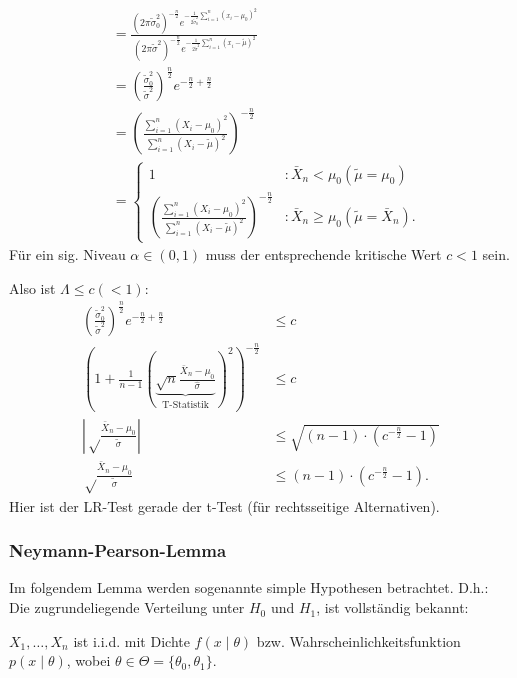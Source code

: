 \documentclass[10pt]{article}
\newcommand{\FZV}{X_1, \ldots, X_n} %
\newcommand{\sni}{\sum_{i=1}^{n}} %
\newenvironment{BSP}[1][]
{\begin{Beispiel}[frametitle=#1]}{\end{Beispiel}}
\begin{document}
\begin{BSP}[Beispiel 2.1.4 (t-Test mit einseitiger Alternative)]
\begin{equation*}
\begin{split}
			&= \frac{(2 \pi \tilde{\sigma}^2_0)^{-\frac{n}{2}} e^{-\frac{1}{2 \tilde{\sigma}^2_0} \sni (x_i - \mu_0)^2}}{(2 \pi \tilde{\sigma}^2)^{-\frac{n}{2}} e^{-\frac{1}{2 \tilde{\sigma}^2} \sni (x_i - \tilde{\mu})^2}}\\
			&= \left(\frac{\tilde{\sigma}^2_0}{\tilde{\sigma}^2}\right)^{\frac{n}{2}} e^{-\frac{n}{2}+\frac{n}{2}}\\
			&=\left(\frac{\sni (X_i - \mu_0)^2}{\sni (X_i - \tilde{\mu})^2}\right)^{-\frac{n}{2}}\\
			&= \begin{cases}
				1 &: \bar{X}_n < \mu_0 (\tilde{\mu} = \mu_0)\\
				\left(\frac{\sni (X_i - \mu_0)^2}{\sni (X_i - \tilde{\mu})^2}\right)^{-\frac{n}{2}} &: \bar{X}_n \geq \mu_0 (\tilde{\mu} = \bar{X}_n).
			\end{cases}
		\end{split}
	\end{equation*}
	Für ein sig. Niveau $\alpha \in (0,1)$ muss der entsprechende kritische Wert $c < 1$ sein. 
	
	Also ist $\Lambda \leq c (< 1)$:
	\begin{equation*}
		\begin{split}
			\left(\frac{\tilde{\sigma}^2_0}{\tilde{\sigma}^2}\right)^{\frac{n}{2}} e^{-\frac{n}{2}+\frac{n}{2}} &\leq c\\
			\left(1 + \frac{1}{n-1} \left( \underbrace{ \sqrt{n} \frac{\bar{X}_n - \mu_0}{\hat{\sigma}}}_{\text{T-Statistik}}\right)^2\right)^{-\frac{n}{2}} & \leq c\\
			\left\vert \sqrt \frac{\bar{X}_n - \mu_0}{\tilde{\sigma}} \right\vert &\leq \sqrt{(n-1)\cdot(c^{-\frac{n}{2}} -1)}\\
			\sqrt \frac{\bar{X}_n - \mu_0}{\tilde{\sigma}} &\leq (n-1)\cdot(c^{-\frac{n}{2}} -1).
		\end{split}
	\end{equation*}
	Hier ist der LR-Test gerade der t-Test (für rechtsseitige Alternativen).
	\end{BSP}
	
	\subsubsection{Neymann-Pearson-Lemma}
	
	Im folgendem Lemma werden sogenannte simple Hypothesen betrachtet. D.h.: Die zugrundeliegende Verteilung unter $H_0$ und $H_1$, ist vollständig bekannt:
	
	$\FZV$ ist i.i.d. mit Dichte $f(x\mid \theta)$ bzw. Wahrscheinlichkeitsfunktion $p(x\mid \theta)$, wobei $\theta \in \Theta = \{\theta_0, \theta_1\}$. 
	
\end{document}
